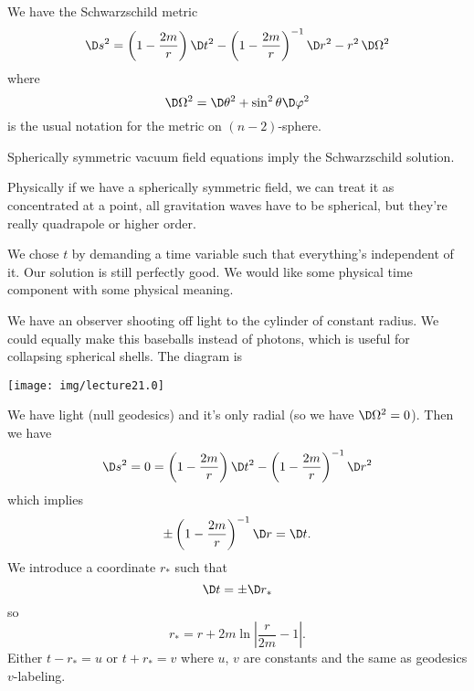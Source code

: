
We have the Schwarzschild metric
\begin{equation}
\D s^{2} = \left(1-\frac{2m}{r}\right)\D t^{2}
-\left(1-\frac{2m}{r}\right)^{-1}\D r^{2}
-r^{2}\,\D\Omega^{2}
\end{equation}
where
\begin{equation}
\D\Omega^{2} = \D\theta^{2}+\sin^{2}\theta\D\varphi^{2}
\end{equation}
is the usual notation for the metric on $(n-2)$-sphere. 

\begin{thm}[Birkhoff]
Spherically symmetric vacuum field equations imply the
Schwarzschild solution.
\end{thm}

Physically if we have a spherically symmetric field, we can treat
it as concentrated at a point, all gravitation waves have to be
spherical, but they're really quadrapole or higher order.

We chose $t$ by demanding a time variable such that everything's
independent of it. Our solution is still perfectly good. We would
like some physical time component with some physical meaning.

We have an observer shooting off light to the cylinder of
constant radius. We could equally make this baseballs instead of
photons, which is useful for collapsing spherical shells. The
diagram is
\begin{center}
\texttt{[image: img/lecture21.0]}
\end{center}
We have light (null geodesics) and it's only radial (so we have
$\D\Omega^{2}=0$). Then we have 
\begin{equation}
\D s^{2} = 0 = \left(1-\frac{2m}{r}\right)\D t^{2}
-\left(1-\frac{2m}{r}\right)^{-1}\D r^{2}
\end{equation}
which implies
\begin{equation}
\pm\left(1-\frac{2m}{r}\right)^{-1}\D r = \D t.
\end{equation}
We introduce a coordinate $r_{*}$ such that
\begin{equation}
\D t= \pm\D r_{*}
\end{equation}
so
\begin{equation}
r_{*} = r + 2m\ln\left|\frac{r}{2m}-1\right|.
\end{equation}
Either $t-r_{*}=u$ or $t+r_{*}=v$ where $u$, $v$ are constants
and the same as geodesics $v$-labeling.

